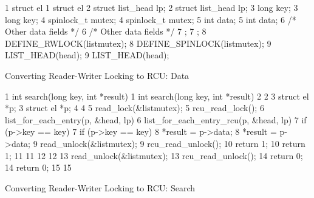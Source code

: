 \begin{listing*}[htbp]
{ \scriptsize
\begin{verbbox}
 1 struct el {                           1 struct el {
 2   struct list_head lp;                2   struct list_head lp;
 3   long key;                           3   long key;
 4   spinlock_t mutex;                   4   spinlock_t mutex;
 5   int data;                           5   int data;
 6   /* Other data fields */             6   /* Other data fields */
 7 };                                    7 };
 8 DEFINE_RWLOCK(listmutex);             8 DEFINE_SPINLOCK(listmutex);
 9 LIST_HEAD(head);                      9 LIST_HEAD(head);
\end{verbbox}
}
\hspace*{0.9in}\OneColumnHSpace{-0.5in}
\theverbbox
\caption{Converting Reader-Writer Locking to RCU: Data}
\label{lst:defer:Converting Reader-Writer Locking to RCU: Data}
\end{listing*}

\begin{listing*}[htbp]
{ \scriptsize
\begin{verbbox}
 1 int search(long key, int *result)     1 int search(long key, int *result)
 2 {                                     2 {
 3   struct el *p;                       3   struct el *p;
 4                                       4
 5   read_lock(&listmutex);              5   rcu_read_lock();
 6   list_for_each_entry(p, &head, lp) { 6   list_for_each_entry_rcu(p, &head, lp) {
 7     if (p->key == key) {              7     if (p->key == key) {
 8       *result = p->data;              8       *result = p->data;
 9       read_unlock(&listmutex);        9       rcu_read_unlock();
10       return 1;                      10       return 1;
11     }                                11     }
12   }                                  12   }
13   read_unlock(&listmutex);           13   rcu_read_unlock();
14   return 0;                          14   return 0;
15 }                                    15 }
\end{verbbox}
}
\hspace*{0.9in}\OneColumnHSpace{-0.5in}
\theverbbox
\caption{Converting Reader-Writer Locking to RCU: Search}
\label{lst:defer:Converting Reader-Writer Locking to RCU: Search}
\end{listing*}

